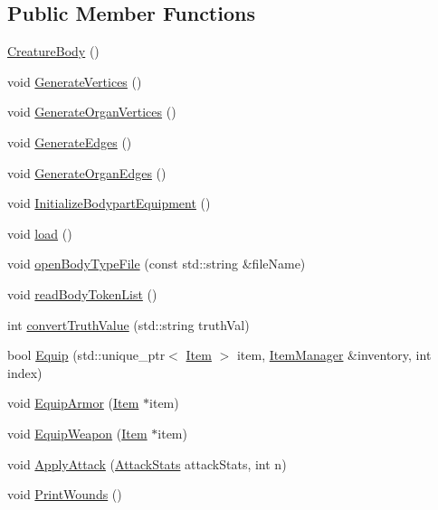 \subsection*{Public Member Functions}
\begin{DoxyCompactItemize}
\item 
\mbox{\hyperlink{class_creature_body_ad40931736728dce1b6cf2c235c883695}{Creature\+Body}} ()
\item 
void \mbox{\hyperlink{class_creature_body_af7047fb13005abbb9a816c0dd64af873}{Generate\+Vertices}} ()
\item 
void \mbox{\hyperlink{class_creature_body_a9cf5cffe6209ed851bf32c2b164d9391}{Generate\+Organ\+Vertices}} ()
\item 
void \mbox{\hyperlink{class_creature_body_a8feda2cfc35e1b76730a31eb368ffed6}{Generate\+Edges}} ()
\item 
void \mbox{\hyperlink{class_creature_body_af1303a40606bf06aed980f14e7027d54}{Generate\+Organ\+Edges}} ()
\item 
void \mbox{\hyperlink{class_creature_body_af2b152c045862bb0fbc370b444bf98f0}{Initialize\+Bodypart\+Equipment}} ()
\item 
void \mbox{\hyperlink{class_creature_body_a947efb646a893964de6244b886bab038}{load}} ()
\item 
void \mbox{\hyperlink{class_creature_body_ac4140e081c8970ad4330c253c615ba33}{open\+Body\+Type\+File}} (const std\+::string \&file\+Name)
\item 
void \mbox{\hyperlink{class_creature_body_a52d765dd974e81a549fd0cb27b355cf2}{read\+Body\+Token\+List}} ()
\item 
int \mbox{\hyperlink{class_creature_body_a2e5f101eb4ce889f47810e8e65164d50}{convert\+Truth\+Value}} (std\+::string truth\+Val)
\item 
bool \mbox{\hyperlink{class_creature_body_a8a55f2c0785aaf956cdee04a538dfb97}{Equip}} (std\+::unique\+\_\+ptr$<$ \mbox{\hyperlink{class_item}{Item}} $>$ item, \mbox{\hyperlink{class_item_manager}{Item\+Manager}} \&inventory, int index)
\item 
void \mbox{\hyperlink{class_creature_body_a5a14d8decef3d1051ac7e9d79a1a4b72}{Equip\+Armor}} (\mbox{\hyperlink{class_item}{Item}} $\ast$item)
\item 
void \mbox{\hyperlink{class_creature_body_af329b825db569100370683f7a9b0263c}{Equip\+Weapon}} (\mbox{\hyperlink{class_item}{Item}} $\ast$item)
\item 
void \mbox{\hyperlink{class_creature_body_aa6525bf32e8f99cc5bd1bda76044964d}{Apply\+Attack}} (\mbox{\hyperlink{struct_attack_stats}{Attack\+Stats}} attack\+Stats, int n)
\item 
void \mbox{\hyperlink{class_creature_body_a82e519351551538b1138fea170776f3f}{Print\+Wounds}} ()
\end{DoxyCompactItemize}

